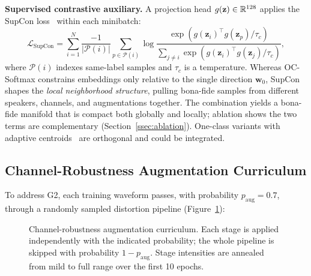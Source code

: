 \noindent\textbf{Supervised contrastive auxiliary.} A projection head
$g(\mathbf{z}) \in \mathbb{R}^{128}$ applies the SupCon loss~\cite{khosla2020supcon} within each
minibatch:
\begin{equation}
\mathcal{L}_{\text{SupCon}} = \sum_{i=1}^N \frac{-1}{|\mathcal{P}(i)|}
    \sum_{p \in \mathcal{P}(i)} \log \frac{
        \exp(g(\mathbf{z}_i)^\top g(\mathbf{z}_p) / \tau_c)
    }{ \sum_{j \neq i} \exp(g(\mathbf{z}_i)^\top g(\mathbf{z}_j) / \tau_c) },
\label{eq:supcon}
\end{equation}
where $\mathcal{P}(i)$ indexes same-label samples and $\tau_c$ is a temperature. Whereas
OC-Softmax constrains embeddings only relative to the single direction $\mathbf{w}_0$,
SupCon shapes the \emph{local neighborhood structure}, pulling bona-fide samples from
different speakers, channels, and augmentations together. The combination yields a
bona-fide manifold that is compact both globally and locally; ablation shows the two
terms are complementary (Section~\ref{ssec:ablation}). One-class variants with adaptive
centroids~\cite{kim2024oneclassknowledge} are orthogonal and could be integrated.

\subsection{Channel-Robustness Augmentation Curriculum}
\label{ssec:augmentation}

To address G2, each training waveform passes, with probability $p_{\text{aug}} = 0.7$,
through a randomly sampled distortion pipeline (Figure~\ref{fig:aug}):

\begin{figure}[t]
\centering
{}
\caption{Channel-robustness augmentation curriculum. Each stage is applied
independently with the indicated probability; the whole pipeline is skipped with
probability $1-p_{\text{aug}}$. Stage intensities are annealed from mild to full range
over the first 10 epochs.}
\label{fig:aug}
\end{figure}

